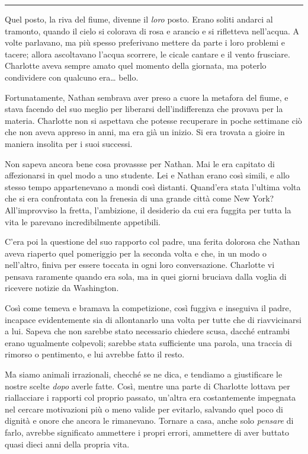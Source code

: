 \documentclass[a4paper,oneside,11pt]{memoir}
\begin{document}
\plainbreak{1}

Quel posto, la riva del fiume, divenne il \emph{loro} posto. Erano soliti
andarci al tramonto, quando il cielo si colorava di rosa e arancio e si
rifletteva nell'acqua. A volte parlavano, ma più spesso preferivano mettere da
parte i loro problemi e tacere; allora ascoltavano l'acqua scorrere, le cicale
cantare e il vento frusciare. Charlotte aveva sempre amato quel momento della
giornata, ma poterlo condividere con qualcuno era\dots{} bello.

Fortunatamente, Nathan sembrava aver preso a cuore la metafora del fiume, e
stava facendo del suo meglio per liberarsi dell'indifferenza che provava per la
materia. Charlotte non si aspettava che potesse recuperare in poche settimane
ciò che non aveva appreso in anni, ma era già un inizio. Si era trovata a gioire
in maniera insolita per i suoi successi.

Non sapeva ancora bene cosa provassse per Nathan. Mai le era capitato di
affezionarsi in quel modo a uno studente. Lei e Nathan erano così simili, e allo
stesso tempo appartenevano a mondi così distanti. Quand'era stata l'ultima volta
che si era confrontata con la frenesia di una grande città come New York?
All'improvviso la fretta, l'ambizione, il desiderio da cui era fuggita per tutta
la vita le parevano incredibilmente appetibili.

C'era poi la questione del suo rapporto col padre, una ferita dolorosa che
Nathan aveva riaperto quel pomeriggio per la seconda volta e che, in un modo o
nell'altro, finiva per essere toccata in ogni loro conversazione. Charlotte vi
pensava raramente quando era sola, ma in quei giorni bruciava dalla voglia di
ricevere notizie da Washington.

Così come temeva e bramava la competizione, così fuggiva e inseguiva il padre,
incapace evidentemente sia di allontanarlo una volta per tutte che di
riavvicinarsi a lui. Sapeva che non sarebbe stato necessario chiedere scusa,
dacché entrambi erano ugualmente colpevoli; sarebbe stata sufficiente una
parola, una traccia di rimorso o pentimento, e lui avrebbe fatto il resto.

Ma siamo animali irrazionali, checché se ne dica, e tendiamo a giustificare le
nostre scelte \emph{dopo} averle fatte. Così, mentre una parte di Charlotte
lottava per riallacciare i rapporti col proprio passato, un'altra era
costantemente impegnata nel cercare motivazioni più o meno valide per evitarlo,
salvando quel poco di dignità e onore che ancora le rimanevano. Tornare a casa,
anche solo \emph{pensare} di farlo, avrebbe significato ammettere i propri
errori, ammettere di aver buttato quasi dieci anni della propria vita.
\end{document}
